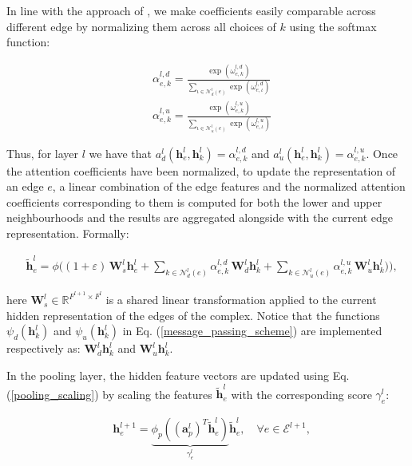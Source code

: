 \documentclass{article}
\begin{document}
In line with the approach of \cite{velivckovic2017graph}, we make coefficients easily comparable across different edge by normalizing them across all choices of $k$ using the softmax function:

\begin{align}
    &\alpha_{e,k}^{l,d} = \frac{\exp\left( \omega_{e,k}^{l,d} \right) } 
    {\sum_{\iota \in \mathcal{N}_{d}^{l}(e)} \exp\left( \omega_{e,\iota}^{l,d}   \right)} \\[5pt]
    &\alpha_{e,k}^{l,u} = \frac{\exp\left( \omega_{e,k}^{l,u} \right) } 
    {\sum_{\iota \in \mathcal{N}_{u}^{l}(e)} \exp\left( \omega_{e,\iota}^{l,u}   \right)}
\end{align}

Thus, for layer $l$ we have that $a^l_d(\mathbf{h}_{e}^l,\mathbf{h}_{k}^l) = \alpha_{e,k}^{l,d}$ and $a^l_u(\mathbf{h}_{e}^l,\mathbf{h}_{k}^l) = \alpha_{e,k}^{l,u}$. Once the attention coefficients have been normalized, to update the representation of an edge $e$, a linear combination of the edge features and the normalized attention coefficients corresponding to them is computed for both the lower and upper neighbourhoods and the results are aggregated alongside with the current edge representation. Formally:


\begin{align}
    &\widetilde{\mathbf{h}}_{e}^{l} = \phi\Bigg((1+\varepsilon) \, \mathbf{W}_{s}^{l} \mathbf{h}_{e}^{l} + \sum_{k \in \mathcal{N}^l_d(e)} \alpha_{e,k}^{l,d} \, \mathbf{W}_{d}^{l} \mathbf{h}_{k}^l + \sum_{k \in \mathcal{N}^l_u(e)} \alpha_{e,k}^{l,u} \, \mathbf{W}_{u}^{l} \mathbf{h}_{k}^l)\Bigg),
\end{align}

here $\mathbf{W}_{s}^l \in \mathbb{R}^{F^{l+1} \times F^{l}}$ is a shared linear transformation applied to the current hidden representation of the edges of the complex. Notice that the functions $\psi_d(\mathbf{h}_{k}^l)$ and $\psi_u(\mathbf{h}_{k}^l)$ in Eq. (\ref{message_passing_scheme}) are implemented respectively as: $\mathbf{W}_{d}^{l} \mathbf{h}_{k}^l$ and $\mathbf{W}_{u}^{l} \mathbf{h}_{k}^l$.

In the pooling layer, the hidden feature vectors are updated using Eq. (\ref{pooling_scaling}) by scaling the features $\widetilde{\mathbf{h}}_{e}^{l}$ with the corresponding score $\gamma_e^l$:

\begin{align}
    &\mathbf{h}_{e}^{l+1} = \underbrace{\phi_p \left( ( \mathbf{a}_p^l )^T \tilde{\mathbf{h}}_e^l  \right)}_{\gamma_e^l}  \tilde{\mathbf{h}}_e^l, \quad \forall e \in \mathcal{E}^{l+1},
\end{align}
\end{document}
